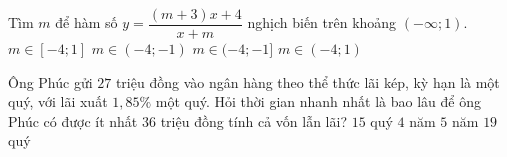 \begin{ex}%
Tìm $m$ để hàm số $y=\dfrac{(m+3)x+4}{x+m}$ nghịch biến trên khoảng $(-\infty;1)$.
\choice
{$m\in [-4;1]$}
{$m\in (-4;-1)$}
{\True $m\in (-4;-1]$}
{$m\in (-4;1)$}
\end{ex}

\begin{ex}%
Ông Phúc gửi $27$ triệu đồng vào ngân hàng theo thể thức lãi kép, kỳ hạn là một quý, với lãi xuất $1,85\%$ một quý. Hỏi thời gian nhanh nhất là bao lâu để ông Phúc có được ít nhất $36$ triệu đồng tính cả vốn lẫn lãi?
\choice
{$15$ quý}
{\True $4$ năm}
{$5$ năm}
{$19$ quý}
\end{ex} 

